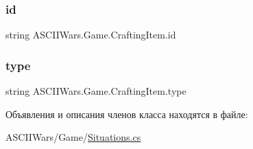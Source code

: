 \subsubsection{\texorpdfstring{id}{id}}
{\footnotesize\ttfamily string A\+S\+C\+I\+I\+Wars.\+Game.\+Crafting\+Item.\+id}

\hypertarget{class_a_s_c_i_i_wars_1_1_game_1_1_crafting_item_a18242bdb01042b4a85c92fdb3bff0d05}{}\label{class_a_s_c_i_i_wars_1_1_game_1_1_crafting_item_a18242bdb01042b4a85c92fdb3bff0d05} 
\subsubsection{\texorpdfstring{type}{type}}
{\footnotesize\ttfamily string A\+S\+C\+I\+I\+Wars.\+Game.\+Crafting\+Item.\+type}



Объявления и описания членов класса находятся в файле\+:\begin{DoxyCompactItemize}
\item 
A\+S\+C\+I\+I\+Wars/\+Game/\hyperlink{_situations_8cs}{Situations.\+cs}\end{DoxyCompactItemize}
